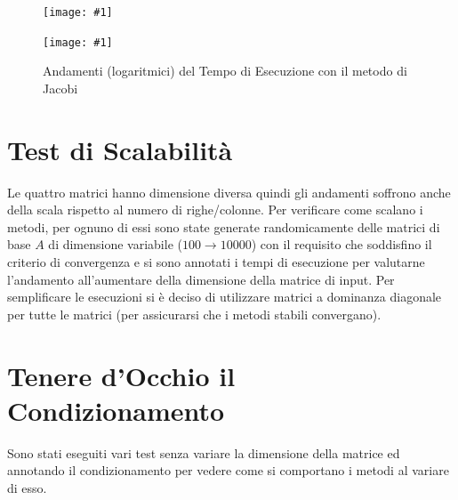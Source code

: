 \documentclass[a4paper,11pt,oneside, table]{article}
\newcommand{\putsubimage}[5] {
  \begin{minipage}{{#4}\linewidth}
	    \centering
      \texttt{[image: \#1]}
	    \caption{#2}\label{#3}
	\end{minipage}
}
\newcommand{\putimagecouple}[2] {
  \begin{figure}[!htb]
      \centering
      #1
      \hspace{0.5cm}
      #2
  \end{figure}
}
\begin{document}
\putimagecouple
  {\putsubimage{./images/te-re-gse.png}{Andamenti (logaritmici) del Tempo di Esecuzione con il metodo di Gauss Seidel}{png:te-re-gse}{0.4}{0.9}}
  {\putsubimage{./images/te-re-jae.png}{Andamenti (logaritmici) del Tempo di Esecuzione con il metodo di Jacobi}{png:te-re-jae}{0.4}{0.9}}



\section{Test di Scalabilit\`a}

Le quattro matrici hanno dimensione diversa quindi gli andamenti soffrono anche della scala rispetto al numero di righe/colonne. Per verificare come scalano i metodi, per ognuno di essi sono state generate randomicamente delle matrici di base $A$ di dimensione variabile ($100 \rightarrow 10000$) con il requisito che soddisfino il criterio di convergenza e si sono annotati i tempi di esecuzione per valutarne l'andamento all'aumentare della dimensione della matrice di input.
Per semplificare le esecuzioni si \`e deciso di utilizzare matrici a dominanza diagonale per tutte le matrici (per assicurarsi che i metodi stabili convergano).

\section{Tenere d'Occhio il Condizionamento}

Sono stati eseguiti vari test senza variare la dimensione della matrice ed annotando il condizionamento per vedere come si comportano i metodi al variare di esso.

\printbibliography[title={Bibliografia}]
\end{document}
